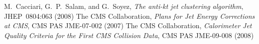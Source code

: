 \documentclass[a4paper]{cmspaper} %
\begin{document}

\begin{thebibliography}{9}
 M.~Cacciari, G.~P.~Salam, and G.~Soyez,
  \textit{The anti-kt jet clustering algorithm},
  JHEP~0804:063 (2008)
 The CMS Collaboration,
  \textit{Plans for Jet Energy Corrections at CMS},
  CMS PAS JME-07-002 (2007)
  The CMS Collaboration,
  \textit{Calorimeter Jet Quality Criteria for the First CMS Collision Data},
  CMS PAS JME-09-008 (2008)
\end{thebibliography}
\end{document}
